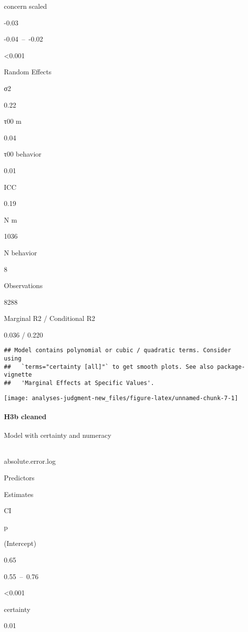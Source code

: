 \documentclass[
]{article}
\begin{document}
concern scaled

-0.03

-0.04~--~-0.02

\textless0.001

Random Effects

σ2

0.22

τ00 m

0.04

τ00 behavior

0.01

ICC

0.19

N m

1036

N behavior

8

Observations

8288

Marginal R2 / Conditional R2

0.036 / 0.220

\begin{verbatim}
## Model contains polynomial or cubic / quadratic terms. Consider using
##   `terms="certainty [all]"` to get smooth plots. See also package-vignette
##   'Marginal Effects at Specific Values'.
\end{verbatim}

\begin{center}\texttt{[image: analyses-judgment-new\_files/figure-latex/unnamed-chunk-7-1]} \end{center}

\hypertarget{h3b-cleaned}{%
\paragraph{H3b cleaned}\label{h3b-cleaned}}

Model with certainty and numeracy\\

~

absolute.error.log

Predictors

Estimates

CI

p

(Intercept)

0.65

0.55~--~0.76

\textless0.001

certainty

0.01
\end{document}
